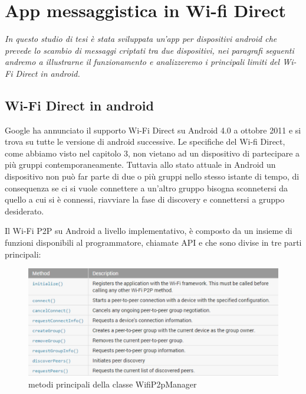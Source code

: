 


\chapter{App messaggistica in Wi-fi Direct}

\begin{minipage}{12cm}\textit{In questo studio di tesi è stata sviluppata un'app per
    dispositivi android che prevede lo scambio di messaggi criptati tra due dispositivi, 
    nei paragrafi seguenti andremo a illustrarne il funzionamento e analizzeremo
    i principali limiti del Wi-Fi Direct in android.}
\end{minipage}




\section{Wi-Fi Direct in android}



Google ha annunciato il supporto Wi-Fi Direct su Android 4.0 a ottobre 2011 
\cite{wikiDi} e si trova su tutte le versione di android successive.
Le specifiche del Wi-fi Direct, come abbiamo visto nel capitolo 3,
non vietano ad un dispositivo di partecipare a più gruppi contemporaneamente.
Tuttavia allo stato attuale in Android  un dispositivo non 
può far parte di due o più gruppi
nello stesso istante di tempo,
di consequenza se ci si vuole connettere a un'altro gruppo
bisogna sconnetersi da quello a cui si è connessi, riavviare la fase di discovery
e connettersi a gruppo desiderato.

Il Wi-Fi P2P su Android a livello implementativo, è composto da un insieme di
funzioni disponibili al programmatore, chiamate API e che sono divise in tre parti
principali:

\begin{figure}
    \centering
    \caption{metodi principali della classe WifiP2pManager}
    \includegraphics[width=1\columnwidth]{imgs/wifip2pmanagerMet.jpg} 
\end{figure}


